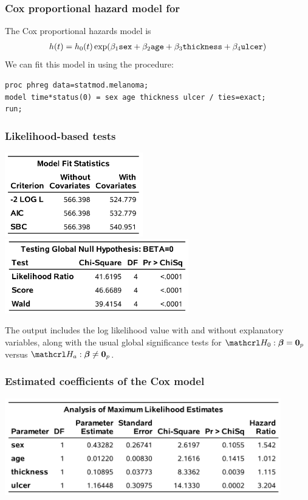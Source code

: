 \documentclass{beamer}
\begin{document}
\begin{frame}[fragile]
\frametitle{Cox proportional hazard model for }
 The Cox proportional hazards model is 
\begin{align*}
h(t) = h_0(t) \exp( \beta_1 \texttt{sex} + \beta_2 \texttt{age} + \beta_3 \texttt{thickness} + \beta_4 \texttt{ulcer})
\end{align*}
 We can fit this model in \SASlang{}  using the  procedure:
\vp \vp
\begin{tcolorbox}[colback=white,colframe=hecblue,title=\SASlang{} code for fitting a proportional hazard model]
{\footnotesize 
\begin{verbatim}
proc phreg data=statmod.melanoma;
model time*status(0) = sex age thickness ulcer / ties=exact;
run;
\end{verbatim}
}
\end{tcolorbox}
\end{frame}

\begin{frame}
\frametitle{Likelihood-based tests}
\vp \vp
\begin{center}
\includegraphics[width = 0.45\textwidth]{img/c7/slides7e12}
\includegraphics[width = 0.6\textwidth]{img/c7/slides7e13}
\end{center}
{\footnotesize
The output includes the log likelihood value with and without explanatory variables, along with the usual global significance tests for $\Hy_0: \bs{\beta}=\bs{0}_p$ versus $\Hy_a: \bs{\beta} \neq \bs{0}_p$.

}
\end{frame}

\begin{frame}
\frametitle{Estimated coefficients of the Cox model}
\vp \vp
\begin{center}
\includegraphics[width = 0.9\textwidth]{img/c7/slides7e14}
\end{center}
% 

\end{frame}
\end{document}
